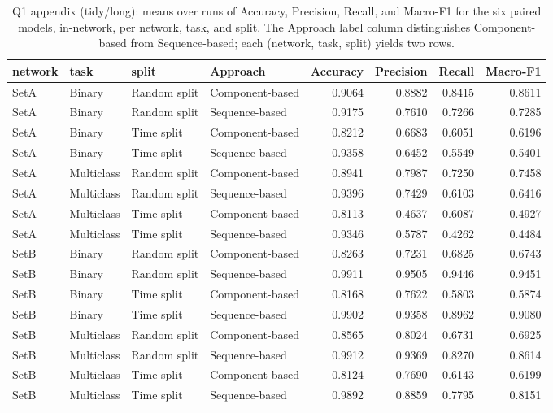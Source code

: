 \begin{table}
\caption{Q1 appendix (tidy/long): means over runs of Accuracy, Precision, Recall, and Macro-F1 for the six paired models, in-network, per network, task, and split. The Approach label column distinguishes Component-based from Sequence-based; each (network, task, split) yields two rows.}
\label{tab:q1_appendix_per_condition}
\begin{tabular}{llllrrrr}
\toprule
network & task & split & Approach & Accuracy & Precision & Recall & Macro-F1 \\
\midrule
SetA & Binary & Random split & Component-based & 0.9064 & 0.8882 & 0.8415 & 0.8611 \\
SetA & Binary & Random split & Sequence-based & 0.9175 & 0.7610 & 0.7266 & 0.7285 \\
SetA & Binary & Time split & Component-based & 0.8212 & 0.6683 & 0.6051 & 0.6196 \\
SetA & Binary & Time split & Sequence-based & 0.9358 & 0.6452 & 0.5549 & 0.5401 \\
SetA & Multiclass & Random split & Component-based & 0.8941 & 0.7987 & 0.7250 & 0.7458 \\
SetA & Multiclass & Random split & Sequence-based & 0.9396 & 0.7429 & 0.6103 & 0.6416 \\
SetA & Multiclass & Time split & Component-based & 0.8113 & 0.4637 & 0.6087 & 0.4927 \\
SetA & Multiclass & Time split & Sequence-based & 0.9346 & 0.5787 & 0.4262 & 0.4484 \\
SetB & Binary & Random split & Component-based & 0.8263 & 0.7231 & 0.6825 & 0.6743 \\
SetB & Binary & Random split & Sequence-based & 0.9911 & 0.9505 & 0.9446 & 0.9451 \\
SetB & Binary & Time split & Component-based & 0.8168 & 0.7622 & 0.5803 & 0.5874 \\
SetB & Binary & Time split & Sequence-based & 0.9902 & 0.9358 & 0.8962 & 0.9080 \\
SetB & Multiclass & Random split & Component-based & 0.8565 & 0.8024 & 0.6731 & 0.6925 \\
SetB & Multiclass & Random split & Sequence-based & 0.9912 & 0.9369 & 0.8270 & 0.8614 \\
SetB & Multiclass & Time split & Component-based & 0.8124 & 0.7690 & 0.6143 & 0.6199 \\
SetB & Multiclass & Time split & Sequence-based & 0.9892 & 0.8859 & 0.7795 & 0.8151 \\

\end{tabular}
\end{table}
